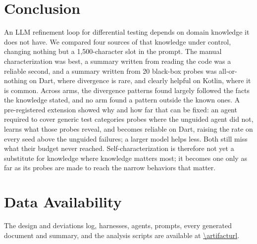 \section{Conclusion}

An LLM refinement loop for differential testing depends on domain knowledge
it does not have. We compared four sources of that knowledge under control,
changing nothing but a 1{,}500-character slot in the prompt. The manual
characterization was best, a summary written from reading the code was a
reliable second, and a summary written from 20 black-box probes was
all-or-nothing on Dart, where divergence is rare, and clearly helpful on
Kotlin, where it is common. Across arms, the divergence patterns found
largely followed the facts the knowledge stated, and no arm found a pattern
outside the known ones.
A pre-registered extension showed why and how far that can be fixed: an
agent required to cover generic test categories probes where the unguided
agent did not, learns what those probes reveal, and becomes reliable on
Dart, raising the rate on every seed above the unguided failures; a larger
model helps less. Both still miss
what their budget never reached. Self-characterization is therefore not yet a
substitute for knowledge where knowledge matters most; it becomes one only
as far as its probes are made to reach the narrow behaviors that matter.

\section*{Data Availability}

The design and deviations log, harnesses, agents, prompts, every generated
document and summary, and the analysis scripts are available at
\url{\artifacturl}.
